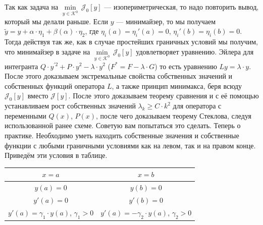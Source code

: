 \documentclass[12pt,a4paper,openany,fleqn]{book}
\newcommand{\J}{\ensuremath{\mathcal{J}}}
\newcommand{\mc}[1]{\ensuremath{\mathcal{#1}}}
\newcommand{\K}{\mc{K}}
\theoremstyle{definition}
\begin{document}
	Так как задача на $\displaystyle\min\limits_{y\in\K^0}\,\J_0[y]$ --- изопериметрическая, то надо повторить вывод, который мы делали раньше. Если $y$ --- минимайзер, то мы получаем $\tilde{y}=y+\alpha\cdot\eta_1+\beta(\alpha)\cdot\eta_2$, где $\eta_i(a)=\eta_i'(a)=0$, $\eta_i'(b)=\eta_i(b)=0$. Тогда действуя так же, как в случае простейших граничных условий мы получим, что минимайзер в задаче на $\displaystyle\min\limits_{y\in\K^0}\,\J_0[y]$ удовлетворяет уравнению. Эйлера для интегранта $Q\cdot y^{\prime2}+P\cdot y^2-\lambda\cdot y^2$ ($F^{\ast}=F-\lambda\cdot G$) то есть уравнению $Ly=\lambda\cdot y$. После этого доказываем экстремальные свойства собственных значений и собственных функций оператора $L$, а также принцип минимакса, беря всюду $\J_0[y]$ вместо $\J[y]$. После этого доказываем теорему сравнения и с её помощью устанавливаем рост собственных значений $\lambda_k\geqslant C\cdot k^2$ для оператора с переменными $Q(x)$, $P(x)$, после чего доказываем теорему Стеклова, следуя использованной ранее схеме. Советую вам попытаться это сделать. Теперь о практике. Необходимо уметь находить собственные значения и собственные функции с любыми граничными условиями как на левом, так и на правом конце. Приведём эти условия в таблице.
	\begin{center}
		\begin{tabular}{|c|c|}
			\hline
			$x=a$ & $x=b$ \\
			\hline
			$y(a)=0$ & $y(b)=0$ \\
			\hline
			$y'(a)=0$ & $y'(b)=0$ \\
			\hline
			$y'(a)=\gamma_1\cdot y(a)$, $\gamma_1>0$ & $y'(a)=-\gamma_2\cdot y(a)$, $\gamma_2>0$ \\
			\hline
		\end{tabular} 
	\end{center}
	
\end{document}
